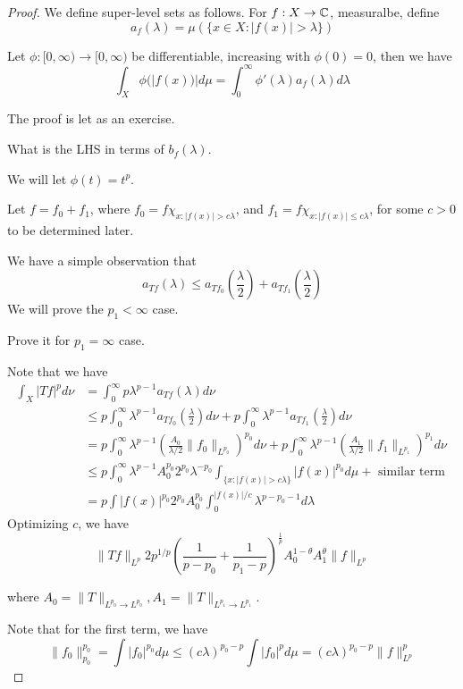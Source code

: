\begin{proof}
    We define super-level sets as follows. For $f: X\to\mathbb{C}$, measuralbe, define
    \begin{equation*}
        a_f(\lambda)=\mu(\{x\in X: |f(x)|>\lambda\})
    \end{equation*}
\begin{proposition}
    Let $\phi:[0,\infty)\to [0,\infty)$ be differentiable, increasing with $\phi(0)=0$, then we have
    \begin{equation*}
        \int_X\phi(|f(x))|d\mu=\int_0^\infty\phi'(\lambda)a_f(\lambda) d\lambda
    \end{equation*}
\end{proposition}
The proof is let as an exercise.
\begin{exercise}
    What is the LHS in terms of $b_f(\lambda)$.
\end{exercise}
We will let $\phi(t)=t^p$.

Let $f=f_0+f_1$, where $f_0=f\chi_{x:|f(x)|>c\lambda}$, and $f_1=f\chi_{x:|f(x)|\leq c\lambda}$, for some $c>0$ to be determined later.

We have a simple observation that
\begin{equation*}
    a_{Tf}(\lambda)\leq a_{Tf_0}\left(\frac{\lambda}{2} \right)+a_{Tf_1}\left(\frac{\lambda}{2} \right)
\end{equation*}
We will prove the $p_1<\infty$ case.
\begin{exercise}
    Prove it for $p_1=\infty$ case.
\end{exercise}


Note that we have
\begin{align*}
    \int_X|Tf|^pd\nu&=\int_0^\infty p\lambda^{p-1}a_{Tf}(\lambda)d\nu\\
    &\leq p\int_0^\infty\lambda^{p-1}a_{Tf_0}\left(\frac{\lambda}{2} \right)d\nu+p\int_0^\infty\lambda^{p-1}a_{Tf_1}\left(\frac{\lambda}{2} \right)d\nu\\
    &=p\int_0^\infty\lambda^{p-1}\left(\frac{A_0}{\lambda/2}\|f_0\|_{L^{p_0}} \right)^{p_0}d\nu+p\int_0^\infty\lambda^{p-1}\left(\frac{A_1}{\lambda/2}\|f_1\|_{L^{p_1}} \right)^{p_1}d\nu\\
    &\leq p\int_0^\infty \lambda^{p-1}A_0^{p_0}2^{p_0}\lambda^{-p_0}\int_{\{x: |f(x)|>c\lambda\}}|f(x)|^{p_0}d\mu+\text{ similar term }\\
    &=p\int |f(x)|^{p_0}2^{p_0}A_0^{p_0}\int_0^{|f(x)|/c}\lambda^{p-p_0-1}d\lambda
\end{align*}
Optimizing $c$, we have
\begin{equation*}
    \|Tf\|_{L^p}2p^{1/p}\left(\frac{1}{p-p_0}+\frac{1}{p_1-p} \right)^\frac{1}{p}A_0^{1-\theta}A_1^\theta\|f\|_{L^p}
\end{equation*}

where $A_0=\|T\|_{L^{p_0}\to L^{p_0}}, A_1=\|T\|_{L^{p_1}\to L^{p_1}}$.


Note that for the first term, we have
\begin{equation*}
    \|f_0\|_{p_0}^{p_0}=\int|f_0|^{p_0}d\mu\leq (c\lambda)^{p_0-p}\int|f_0|^pd\mu=(c\lambda)^{p_0-p}\|f\|_{L^p}^p
\end{equation*}




\end{proof}


